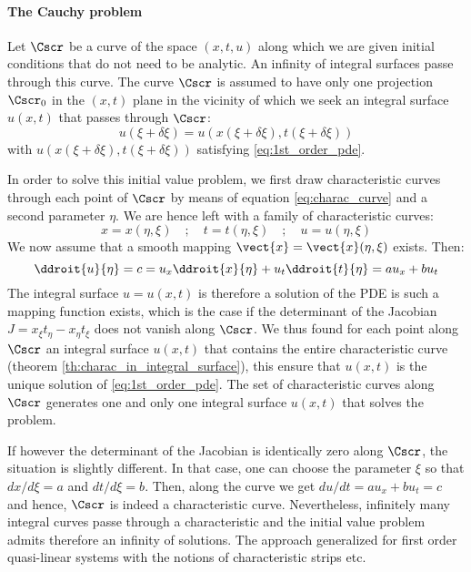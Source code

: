 \paragraph{The Cauchy problem} Let $\Cscr$ be a curve of the space $(x,t,u)$ along which we are given initial conditions that do not need to be analytic. An infinity of integral surfaces passe through this curve. The curve $\Cscr$ is assumed to have only one projection $\Cscr_0$ in the $(x,t)$ plane in the vicinity of which we seek an integral surface $u(x,t)$ that passes through $\Cscr$:
\begin{equation}
  \label{eq:IVP_char}
  u(\xi + \delta\xi) = u(x(\xi + \delta\xi),t(\xi + \delta\xi))
\end{equation}
with $u(x(\xi + \delta\xi),t(\xi + \delta\xi))$ satisfying \eqref{eq:1st_order_pde}.

In order to solve this initial value problem, we first draw characteristic curves through each point of $\Cscr$ by means of equation \eqref{eq:charac_curve} and a second parameter $\eta$. We are hence left with a family of characteristic curves:
\begin{equation}
  \label{eq:2}
  x=x(\eta,\xi) \quad ; \quad t=t(\eta,\xi)\quad ;\quad u=u(\eta,\xi)
\end{equation}
We now assume that a smooth mapping $\vect{x}=\vect{x}(\eta,\xi)$ exists. Then:
\begin{equation}
  \label{eq:3}
  \ddroit{u}{\eta} = c = u_x \ddroit{x}{\eta} + u_t \ddroit{t}{\eta} =  a u_x + b u_t
\end{equation}
The integral surface $u=u(x,t)$ is therefore a solution of the PDE is such a mapping function exists, which is the case if the determinant of the Jacobian $J=x_\xi t_\eta - x_\eta t_\xi $ does not vanish along $\Cscr$. We thus found for each point along $\Cscr$ an integral surface $u(x,t)$ that contains the entire characteristic curve (theorem \ref{th:charac_in_integral_surface}), this ensure that $u(x,t)$ is the unique solution of \eqref{eq:1st_order_pde}. The set of characteristic curves along $\Cscr$ generates one and only one integral surface $u(x,t)$ that solves the problem.

If however the determinant of the Jacobian is identically zero along $\Cscr$, the situation is slightly different. In that case, one can choose the parameter $\xi$ so that $dx/d\xi=a$ and $dt/d\xi = b$. Then, along the curve we get $du/dt = a u_x + b u_t = c$ and hence, $\Cscr$ is indeed a characteristic curve. Nevertheless, infinitely many integral curves passe through a characteristic and the initial value problem admits therefore an infinity of solutions.%
The approach generalized for first order quasi-linear systems with the notions of characteristic strips etc.

